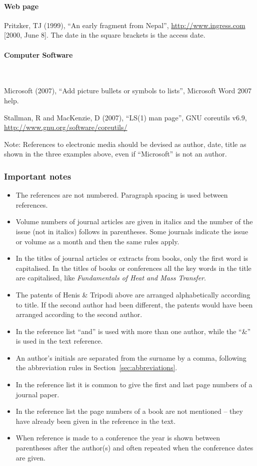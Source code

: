 \documentclass[a5paper, 10pt]{article}
\begin{document}
\paragraph{Web page}

Pritzker, TJ (1999), ``An early fragment from Nepal'',
  \url{http://www.ingress.com} [2000, June 8].  The date in the square brackets is the access date.

\paragraph{Computer Software}
\label{page:ref_compsoftware}
~

Microsoft (2007), ``Add picture bullets or symbols to lists'',
  Microsoft Word 2007 help.

Stallman, R and MacKenzie, D (2007), ``LS(1) man page'', GNU
  coreutils v6.9, \url{http://www.gnu.org/software/coreutils/}

Note: References to electronic media should be devised as author,
date, title as shown in the three examples above, even if
``Microsoft'' is not an author.

\subsubsection*{Important notes}

\begin{itemize}
\item The references are not numbered.  Paragraph spacing is used
  between references.
\item Volume numbers of journal articles are given in italics and the
  number of the issue (not in italics) follows in parentheses.  Some
  journals indicate the issue or volume as a month and then the same
  rules apply.
\item In the titles of journal articles or extracts from books, only
  the first word is capitalised.  In the titles of books or
  conferences all the key words in the title are capitalised, like
  \textit{Fundamentals of Heat and Mass Transfer}.
\item The patents of Henis \& Tripodi above are arranged
  alphabetically according to title.  If the second author had been
  different, the patents would have been arranged according to the
  second author.
\item In the reference list ``and'' is used with more than one author,
  while the ``\&'' is used in the text reference.
\item An author's initials are separated from the surname by a comma,
  following the abbreviation rules in Section~\ref{sec:abbreviations}.
\item In the reference list it is common to give the first and last
  page numbers of a journal paper.
\item In the reference list the page numbers of a book are not
  mentioned -- they have already been given in the reference in the
  text.
\item When reference is made to a conference the year is shown between
  parentheses after the author(s) and often repeated when the conference
  dates are given.
\end{itemize}
\end{document}
